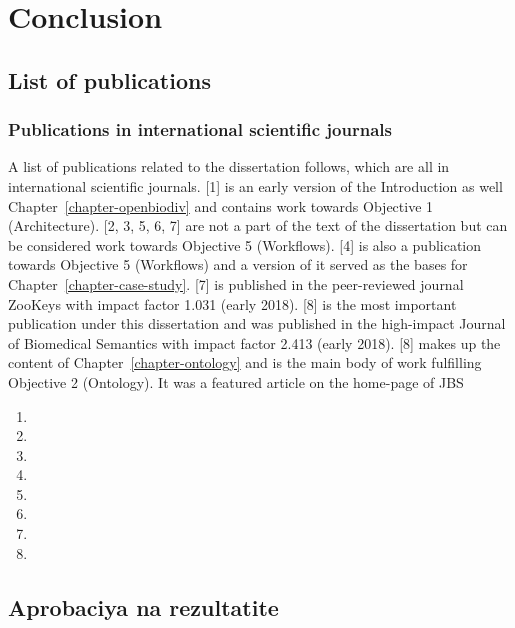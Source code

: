 \chapter{Conclusion}
\label{chapter:summary}

\section{List of publications}

\subsection{Publications in international scientific journals}

A list of publications related to the dissertation follows, which are all in international scientific journals. [1] is an early version of the Introduction as well Chapter~\ref{chapter-openbiodiv} and contains work towards Objective 1 (Architecture). [2, 3, 5, 6, 7] are not a part of the text of the dissertation but can be considered work towards Objective 5 (Workflows). [4] is also a publication towards Objective 5 (Workflows) and a version of it served as the bases for Chapter~\ref{chapter-case-study}. [7] is published in the peer-reviewed journal ZooKeys with impact factor 1.031 (early 2018). [8] is the most important publication under this dissertation and was published in the high-impact Journal of Biomedical Semantics with impact factor 2.413 (early 2018). [8] makes up the content of Chapter~\ref{chapter-ontology} and is the main body of work fulfilling Objective 2 (Ontology). It was a featured article on the home-page of JBS 

\begin{enumerate}
\item {}
\item {}
\item {}
\item {}
\item {}
\item {}
\item {}
\item {}
\end{enumerate}

\section{Aprobaciya na rezultatite}

